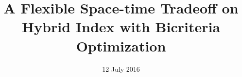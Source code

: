 \documentclass{sig-alternate-05-2015}
\begin{document}






%

\title{A Flexible Space-time Tradeoff on Hybrid Index with Bicriteria Optimization}

%
\author{
}
\date{12 July 2016}
\end{document}
